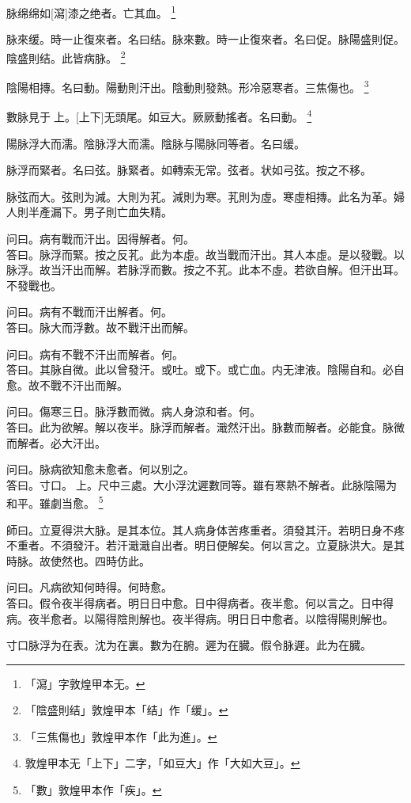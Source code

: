 \documentclass[11pt,oneside,b5paper]{ctexbook}
\begin{document}
\begin{flushleft}
脉绵绵如[瀉]漆之绝者。亡其血。
\footnote{「瀉」字敦煌甲本无。}

脉來缓。時一止復來者。名曰结。脉來數。時一止復來者。名曰促。脉陽盛則促。陰盛則结。此皆病脉。
\footnote{「陰盛則结」敦煌甲本「结」作「缓」。}

陰陽相摶。名曰動。陽動則汗出。陰動則發熱。形冷惡寒者。三焦傷也。
\footnote{「三焦傷也」敦煌甲本作「此为進」。}

數脉見于{𬮦}上。[上下]无頭尾。如豆大。厥厥動搖者。名曰動。
\footnote{敦煌甲本无「上下」二字，「如豆大」作「大如大豆」。}

陽脉浮大而濡。陰脉浮大而濡。陰脉与陽脉同等者。名曰缓。

脉浮而緊者。名曰弦。脉緊者。如轉索无常。弦者。状如弓弦。按之不移。

脉弦而大。弦則为減。大則为芤。減則为寒。芤則为虛。寒虛相摶。此名为革。婦人則半產漏下。男子則亡血失精。

问曰。病有戰而汗出。因得解者。何。\\
答曰。脉浮而緊。按之反芤。此为本虛。故当戰而汗出。其人本虛。是以發戰。以脉浮。故当汗出而解。若脉浮而數。按之不芤。此本不虛。若欲自解。但汗出耳。不發戰也。

问曰。病有不戰而汗出解者。何。\\
答曰。脉大而浮數。故不戰汗出而解。

问曰。病有不戰不汗出而解者。何。\\
答曰。其脉自微。此以曾發汗。或吐。或下。或亡血。内无津液。陰陽自和。必自愈。故不戰不汗出而解。

问曰。傷寒三日。脉浮數而微。病人身涼和者。何。\\
答曰。此为欲解。解以夜半。脉浮而解者。濈然汗出。脉數而解者。必能食。脉微而解者。必大汗出。

问曰。脉病欲知愈未愈者。何以别之。\\
答曰。寸口。{𬮦}上。尺中三處。大小浮沈遲數同等。雖有寒熱不解者。此脉陰陽为和平。雖劇当愈。
\footnote{「數」敦煌甲本作「疾」。}

師曰。立夏得洪大脉。是其本位。其人病身体苦疼重者。須發其汗。若明日身不疼不重者。不須發汗。若汗濈濈自出者。明日便解矣。何以言之。立夏脉洪大。是其時脉。故使然也。四時仿此。

问曰。凡病欲知何時得。何時愈。\\
答曰。假令夜半得病者。明日日中愈。日中得病者。夜半愈。何以言之。日中得病。夜半愈者。以陽得陰則解也。夜半得病。明日日中愈者。以陰得陽則解也。

寸口脉浮为在表。沈为在裏。數为在腑。遲为在臓。假令脉遲。此为在臓。


\end{flushleft}
\end{document}
